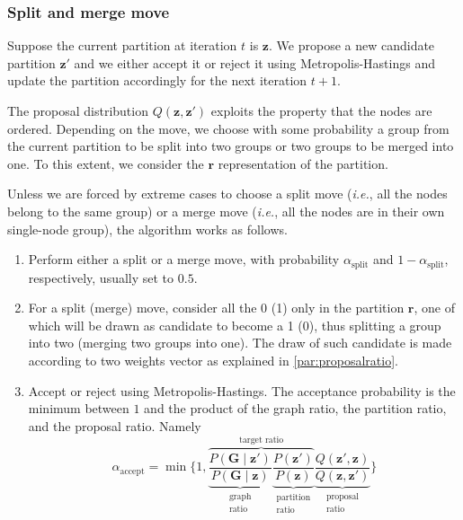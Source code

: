 \subsubsection{Split and merge move}

Suppose the current partition at iteration $t$ is $\bm{z}$.
We propose a new candidate partition $\bm{z}'$ and we either accept it or reject it using Metropolis-Hastings and update the partition accordingly for the next iteration $t+1$.

The proposal distribution $Q(\bm{z},\bm{z}')$ exploits the property that the nodes are ordered.
Depending on the move, we choose with some probability a group from the current partition to be split into two groups or two groups to be merged into one.
To this extent, we consider the $\bm{r}$ representation of the partition.

Unless we are forced by extreme cases to choose a split move (\emph{i.e.}, all the nodes belong to the same group) or a merge move (\emph{i.e.}, all the nodes are in their own single-node group), the algorithm works as follows.

\begin{enumerate}
    \item Perform either a split or a merge move, with probability $\alpha_{\text{split}}$ and $1-\alpha_{\text{split}}$, respectively, usually set to $0.5$.
    \item For a split (merge) move, consider all the \num{0} (\num{1}) only in the partition $\bm{r}$, one of which will be drawn as candidate to become a \num{1} (\num{0}), thus splitting a group into two (merging two groups into one).
    The draw of such candidate is made according to two weights vector as explained in \ref{par:proposalratio}.
    \item Accept or reject using Metropolis-Hastings.
    The acceptance probability is the minimum between $1$ and the product of the graph ratio, the partition ratio, and the proposal ratio. Namely
    \begin{equation}
        \alpha_{\text{accept}} = \min
       \bigg\{1,
       \overbrace{
       \underbrace{\frac{P(\bm{G} \mid \bm{z}')}{P(\bm{G} \mid \bm{z})}}_{\substack{\text{graph}\\\text{ratio}}}
       \underbrace{\frac{P(\bm{z}')}{P(\bm{z})}}_{\substack{\text{partition}\\\text{ratio}}}
       }^{\text{target ratio}}
       \underbrace{\frac{Q(\bm{z}',\bm{z})}{Q(\bm{z},\bm{z}')}}_{\substack{\text{proposal}\\\text{ratio}}}
       \bigg\}
       \label{eq:alphaaccept}
    \end{equation}
\end{enumerate}

